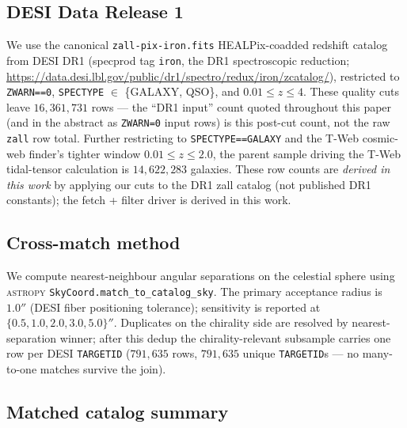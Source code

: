 \documentclass[aps,prd,twocolumn,superscriptaddress,showpacs,preprintnumbers,nofootinbib,longbibliography,floatfix]{revtex4-2}
\begin{document}
\subsection{DESI Data Release 1}

We use the canonical \texttt{zall-pix-iron.fits} HEALPix-coadded
redshift catalog from DESI DR1 (specprod tag \texttt{iron}, the DR1
spectroscopic reduction;
\url{https://data.desi.lbl.gov/public/dr1/spectro/redux/iron/zcatalog/}),
restricted to \texttt{ZWARN==0},
\texttt{SPECTYPE} $\in$ \{GALAXY, QSO\}, and $0.01 \le z \le 4$.
These quality cuts leave $16{,}361{,}731$ rows — the ``DR1 input''
count quoted throughout this paper (and in the abstract as
\texttt{ZWARN=0} input rows) is this post-cut count, not the raw
\texttt{zall} row total. Further restricting to
\texttt{SPECTYPE==GALAXY} and the T-Web cosmic-web finder's tighter
window $0.01 \le z \le 2.0$, the parent sample driving the T-Web
tidal-tensor calculation is $14{,}622{,}283$ galaxies. These row counts are
\emph{derived in this work} by applying our cuts to the DR1 zall
catalog (not published DR1 constants); the fetch + filter driver
is derived in this work.

\subsection{Cross-match method}

We compute nearest-neighbour angular separations on the celestial sphere
using \textsc{astropy} \texttt{SkyCoord.match\_to\_catalog\_sky}. The
primary acceptance radius is $1.0''$ (DESI fiber positioning tolerance);
sensitivity is reported at $\{0.5, 1.0, 2.0, 3.0, 5.0\}''$. Duplicates
on the chirality side are resolved by nearest-separation winner; after
this dedup the chirality-relevant subsample carries one row per DESI
\texttt{TARGETID} ($791{,}635$ rows, $791{,}635$ unique
\texttt{TARGETID}s — no many-to-one matches survive the join).

\subsection{Matched catalog summary}\label{sec:matched_summary}
\end{document}
